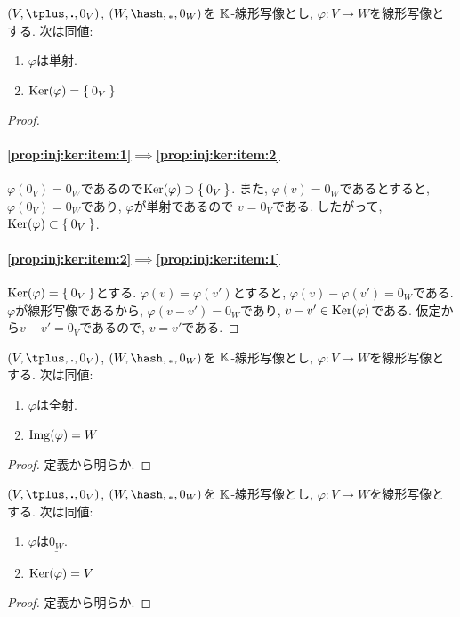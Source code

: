 \begin{prop}
  $(V,\plus,\act,0_V)$,
  $(W,\pplus,\aact,0_W)$を
  $\mathbb{K}$-線形写像とし,
  $\varphi\colon V\to W$を線形写像とする.
  次は同値:
  \begin{enumerate}
  \item
\label{prop:inj:ker:item:1}
$\varphi$は単射.
  \item
\label{prop:inj:ker:item:2}
  $\operatorname{Ker}(\varphi)=\Set{0_V}$
  \end{enumerate}
\end{prop}
\begin{proof}
\paragraph{\ref{prop:inj:ker:item:1}$\implies$\ref{prop:inj:ker:item:2}}
$\varphi(0_V)=0_W$であるので$\operatorname{Ker}(\varphi)\supset \Set{0_V}$.
また,
$\varphi(v)=0_W$であるとすると,
$\varphi(0_V)=0_W$であり,
$\varphi$が単射であるので
$v=0_V$である.
したがって, $\operatorname{Ker}(\varphi)\subset\Set{0_V}$.

\paragraph{\ref{prop:inj:ker:item:2}$\implies$\ref{prop:inj:ker:item:1}}
$\operatorname{Ker}(\varphi)=\Set{0_V}$とする.
$\varphi(v)=\varphi(v')$とすると,
$\varphi(v)-\varphi(v')=0_W$である.
$\varphi$が線形写像であるから,
$\varphi(v-v')=0_W$であり,
$v-v'\in \operatorname{Ker}(\varphi)$である.
仮定から$v-v'=0_V$であるので,
$v=v'$である.
\end{proof}

\begin{prop}
  $(V,\plus,\act,0_V)$,
  $(W,\pplus,\aact,0_W)$を
  $\mathbb{K}$-線形写像とし,
  $\varphi\colon V\to W$を線形写像とする.
  次は同値:
  \begin{enumerate}
  \item $\varphi$は全射.
  \item $\operatorname{Img}(\varphi)=W$
  \end{enumerate}
\end{prop}
\begin{proof}
定義から明らか.
\end{proof}

\begin{prop}
  $(V,\plus,\act,0_V)$,
  $(W,\pplus,\aact,0_W)$を
  $\mathbb{K}$-線形写像とし,
  $\varphi\colon V\to W$を線形写像とする.
  次は同値:
  \begin{enumerate}
  \item $\varphi$は$\underline{0_W}$.
  \item $\operatorname{Ker}(\varphi)=V$
  \end{enumerate}
\end{prop}
\begin{proof}
定義から明らか.
\end{proof}


